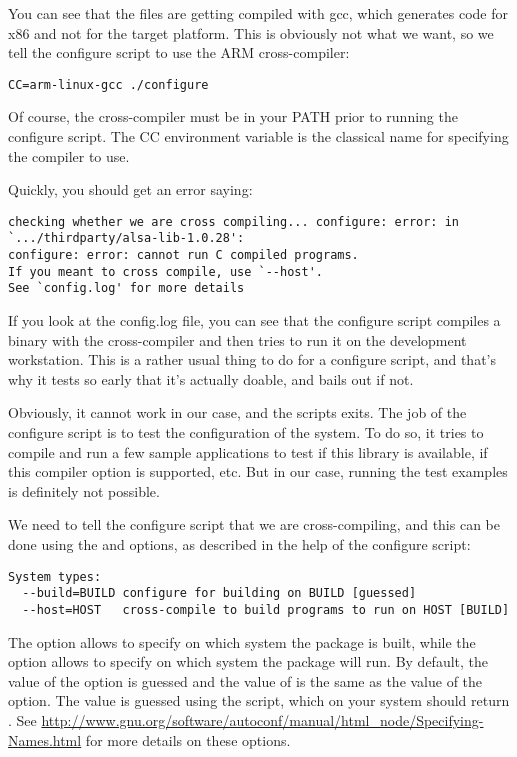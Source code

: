 You can see that the files are getting compiled with gcc, which
generates code for x86 and not for the target platform. This is
obviously not what we want, so we tell the configure script to use the
ARM cross-compiler:

\begin{verbatim}
CC=arm-linux-gcc ./configure
\end{verbatim}

Of course, the  cross-compiler must be in your
PATH prior to running the configure script. The CC environment
variable is the classical name for specifying the compiler to
use.

Quickly, you should get an error saying:

\begin{verbatim}
checking whether we are cross compiling... configure: error: in `.../thirdparty/alsa-lib-1.0.28':
configure: error: cannot run C compiled programs.
If you meant to cross compile, use `--host'.
See `config.log' for more details
\end{verbatim}

If you look at the config.log file, you can see that the configure
script compiles a binary with the cross-compiler and then tries to run
it on the development workstation. This is a rather usual thing to do
for a configure script, and that's why it tests so early that it's
actually doable, and bails out if not.

Obviously, it cannot work in our case, and the scripts exits. The job
of the configure script is to test the configuration of the system. To
do so, it tries to compile and run a few sample applications to test
if this library is available, if this compiler option is supported,
etc. But in our case, running the test examples is definitely not
possible.

We need to tell the configure script that we are cross-compiling, and
this can be done using the  and  options,
as described in the help of the configure script:

\begin{verbatim}
System types:
  --build=BUILD	configure for building on BUILD [guessed]
  --host=HOST	cross-compile to build programs to run on HOST [BUILD]
\end{verbatim}

The  option allows to specify on which system the
package is built, while the  option allows to specify on
which system the package will run. By default, the value of the
 option is guessed and the value of  is the
same as the value of the  option. The value is guessed
using the  script, which on your system should
return . See
\url{http://www.gnu.org/software/autoconf/manual/html_node/Specifying-Names.html}
for more details on these options.

